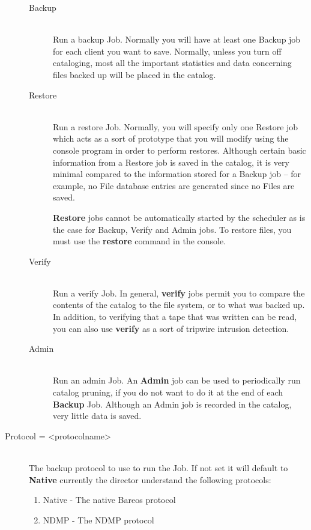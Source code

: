 \begin{description}
\begin{description}
\item [Backup] \hfill \\
Run a backup Job. Normally you will  have at least one Backup job for each
client you want  to save. Normally, unless you turn off cataloging,  most all
the important statistics and data concerning  files backed up will be placed
in the catalog.

\item [Restore] \hfill \\
Run a restore Job.  Normally, you will specify only one Restore job
which acts as a sort of prototype that you will modify using the console
program in order to perform restores.  Although certain basic
information from a Restore job is saved in the catalog, it is very
minimal compared to the information stored for a Backup job -- for
example, no File database entries are generated since no Files are
saved.

{\bf Restore} jobs cannot be
automatically started by the scheduler as is the case for Backup, Verify
and Admin jobs. To restore files, you must use the {\bf restore} command
in the console.


\item [Verify] \hfill \\
Run a verify Job. In general, {\bf verify}  jobs permit you to compare the
contents of the catalog  to the file system, or to what was backed up. In
addition,  to verifying that a tape that was written can be read,  you can
also use {\bf verify} as a sort of tripwire  intrusion detection.

\item [Admin] \hfill \\
Run an admin Job. An {\bf Admin} job can  be used to periodically run catalog
pruning, if you  do not want to do it at the end of each {\bf Backup}  Job.
Although an Admin job is recorded in the  catalog, very little data is saved.
\end{description}

\item [Protocol = {\textless}protocolname{\textgreater}] \hfill \\
The backup protocol to use to run the Job. If not set it will default
to {\bf Native} currently the director understand the following protocols:
\begin{enumerate}
\item Native - The native Bareos protocol
\item NDMP - The NDMP protocol
\end{enumerate}


\end{description}
